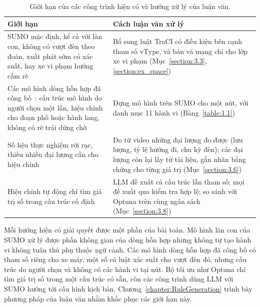 \documentclass[../main.tex]{subfiles}
\begin{document}
\begin{table}[!htbp]
\centering
\small
\caption{Giới hạn của các công trình hiện có và hướng xử lý của luận văn.}
\label{table:2.2}
\begin{tabular}{|>{\raggedright\arraybackslash}p{5.2cm}|>{\raggedright\arraybackslash}p{8.8cm}|}
\hline
\textbf{Giới hạn} & \textbf{Cách luận văn xử lý} \\
\hline
SUMO mặc định, kể cả với làn con, không có vượt đèn theo đoàn, xuất phát sớm có xác suất, hay xe vi phạm hướng cấm rẽ & Bổ sung luật TraCI có điều kiện bên cạnh tham số vType, và bản vá mạng chỉ cho lớp xe vi phạm (Mục~\ref{section:3.3}, \ref{section:ex_space}) \\
\hline
Các mô hình dòng hỗn hợp đã công bố~\cite{saval2023mixed,vu2023vissim,lee2009motorcycles}: cấu trúc mô hình do người chọn một lần, hiệu chỉnh cho đoạn phố hoặc hành lang, không có rẽ trái dừng chờ & Dựng mô hình trên SUMO cho một nút, với danh mục 11 hành vi (Bảng~\ref{table:1.1}) \\
\hline
Số liệu thực nghiệm rời rạc, thiếu nhiều đại lượng cần cho hiệu chỉnh & Đo từ video những đại lượng đo được (lưu lượng, tỷ lệ hướng đi, chu kỳ đèn); các đại lượng còn lại lấy từ tài liệu, gắn nhãn bằng chứng cho từng giá trị (Mục~\ref{section:3.6}) \\
\hline
Hiệu chỉnh tự động chỉ tìm giá trị số trong cấu trúc cố định & LLM đề xuất cả cấu trúc lẫn tham số; mọi đề xuất qua kiểm tra hợp lệ; so sánh với Optuna trên cùng ngân sách (Mục~\ref{section:3.8}) \\
\hline
\end{tabular}
\end{table}

Mỗi hướng hiện có giải quyết được một phần của bài toán. Mô hình làn con của SUMO xử lý được phần không gian của dòng hỗn hợp nhưng không tự tạo hành vi không tuân thủ phụ thuộc ngữ cảnh. Các mô hình dòng hỗn hợp đã công bố có tham số riêng cho xe máy, một số có luật xác suất cho vượt đèn đỏ, nhưng cấu trúc do người chọn và không có các hành vi tại nút. Bộ tối ưu như Optuna chỉ tìm giá trị số trong một cấu trúc có sẵn, còn các công trình dùng LLM với SUMO hướng tới cấu hình kịch bản. Chương~\ref{chapter:RuleGeneration} trình bày phương pháp của luận văn nhằm khắc phục các giới hạn này.
\end{document}
